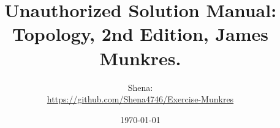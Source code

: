 \documentclass[a4paper,12pt]{article}
\begin{document}
\title{Unauthorized Solution Manual: Topology, 2nd Edition, James Munkres.}
\author{Shena:\\ \url{https://github.com/Shena4746/Exercise-Munkres}}
\date{\today}
\maketitle
\end{document}
